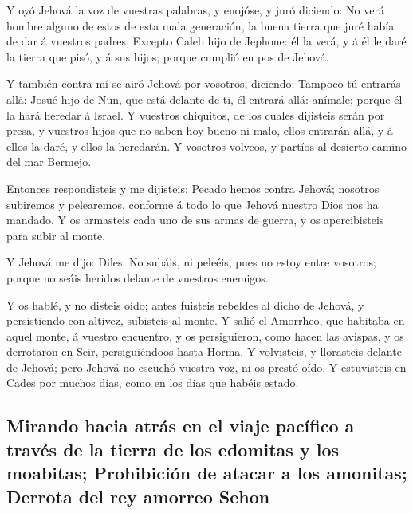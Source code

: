  Y oyó Jehová la voz de vuestras palabras, y enojóse, y
juró diciendo:  No verá hombre alguno de estos de esta mala
generación, la buena tierra que juré había de dar á vuestros padres,
 Excepto Caleb hijo de Jephone: él la verá, y á él le daré
la tierra que pisó, y á sus hijos; porque cumplió en pos de Jehová.

 Y también contra mí se airó Jehová por vosotros, diciendo:
Tampoco tú entrarás allá:  Josué hijo de Nun, que está
delante de ti, él entrará allá: anímale; porque él la hará heredar á
Israel.  Y vuestros chiquitos, de los cuales dijisteis
serán por presa, y vuestros hijos que no saben hoy bueno ni malo, ellos
entrarán allá, y á ellos la daré, y ellos la heredarán.  Y
vosotros volveos, y partíos al desierto camino del mar Bermejo.

 Entonces respondisteis y me dijisteis: Pecado hemos contra
Jehová; nosotros subiremos y pelearemos, conforme á todo lo que Jehová
nuestro Dios nos ha mandado. Y os armasteis cada uno de sus armas de
guerra, y os apercibisteis para subir al monte.

 Y Jehová me dijo: Diles: No subáis, ni peleéis, pues no
estoy entre vosotros; porque no seáis heridos delante de vuestros
enemigos.

 Y os hablé, y no disteis oído; antes fuisteis rebeldes al
dicho de Jehová, y persistiendo con altivez, subisteis al monte.
 Y salió el Amorrheo, que habitaba en aquel monte, á
vuestro encuentro, y os persiguieron, como hacen las avispas, y os
derrotaron en Seir, persiguiéndoos hasta Horma.  Y
volvisteis, y llorasteis delante de Jehová; pero Jehová no escuchó
vuestra voz, ni os prestó oído.  Y estuvisteis en Cades por
muchos días, como en los días que habéis estado.

\hypertarget{mirando-hacia-atruxe1s-en-el-viaje-pacuxedfico-a-travuxe9s-de-la-tierra-de-los-edomitas-y-los-moabitas-prohibiciuxf3n-de-atacar-a-los-amonitas-derrota-del-rey-amorreo-sehon}{%
\subsection{Mirando hacia atrás en el viaje pacífico a través de la
tierra de los edomitas y los moabitas; Prohibición de atacar a los
amonitas; Derrota del rey amorreo
Sehon}\label{mirando-hacia-atruxe1s-en-el-viaje-pacuxedfico-a-travuxe9s-de-la-tierra-de-los-edomitas-y-los-moabitas-prohibiciuxf3n-de-atacar-a-los-amonitas-derrota-del-rey-amorreo-sehon}}

